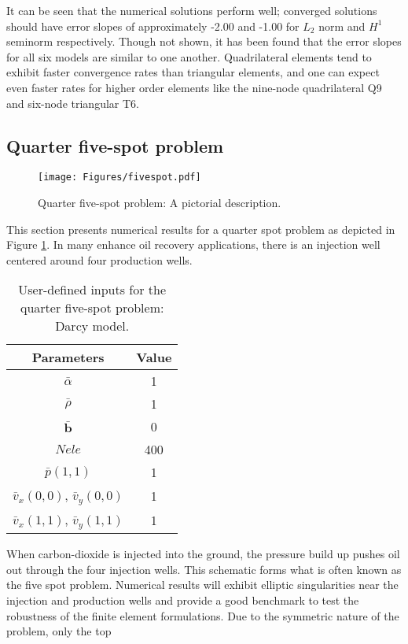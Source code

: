 \documentclass[11pt,reqno]{amsart}
\begin{document}
It can be seen that the numerical solutions perform well; converged solutions should 
have error slopes of approximately -2.00 and -1.00 for $L_2$ norm and $H^1$ seminorm 
respectively. Though not shown, it has been found that 
the error slopes for all six models are similar to one another. Quadrilateral elements 
tend to exhibit faster convergence rates than triangular elements, and one can 
expect even faster rates for higher order
elements like the nine-node quadrilateral Q9 and six-node triangular T6.

\subsection{Quarter five-spot problem}
\begin{figure}[t!]
  \centering
  \texttt{[image: Figures/fivespot.pdf]}
  \caption{Quarter five-spot problem: A pictorial description.}
  \label{Fig:fivespot}
\end{figure}
This section presents numerical results for a quarter 
spot problem as depicted in Figure \ref{Fig:fivespot}. 
In many enhance oil recovery applications, there is an 
injection well centered around four production wells. 
\begin{table}[b!]
  \centering
  \caption{User-defined inputs for the quarter five-spot problem: Darcy model.}
  \begin{tabular}{cc}
    \hline
    Parameters & Value \\
    \hline
    $\bar{\alpha}$ & 1 \\
    $\bar{\rho}$ & 1 \\
    $\bar{\mathbf{b}}$ & 0 \\
    $Nele$ & 400 \\
    $\bar{p}(1,1)$ & 1 \\
    $\bar{v}_x(0,0)$, $\bar{v}_y(0,0)$ & 1 \\
    $\bar{v}_x(1,1)$, $\bar{v}_y(1,1)$ & 1 \\
    \hline
  \end{tabular}
  \label{Tab:quarter_spot}
\end{table}
When carbon-dioxide is injected into the ground, the pressure build up pushes oil out through the four
injection wells. This schematic forms what is often known as the five spot problem. Numerical results will 
exhibit elliptic singularities near the injection and production wells and provide a good benchmark to test 
the robustness of the finite element formulations. Due to the symmetric nature of the problem, only the top 
\end{document}
